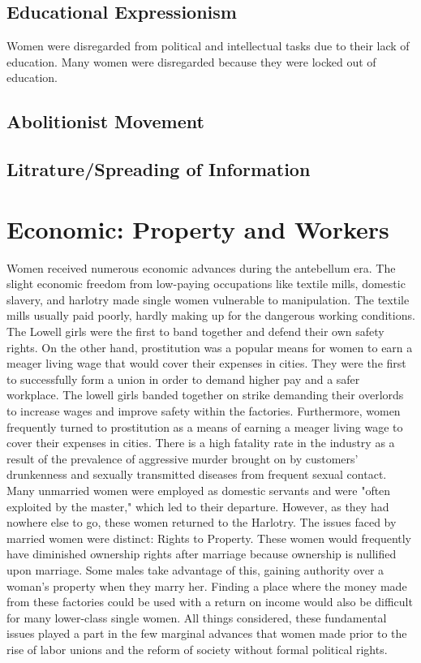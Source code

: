 \documentclass{article}
\begin{document}
\subsection{Educational Expressionism}
Women were disregarded from political and intellectual tasks due to their lack of education. Many women were disregarded because they were locked out of education.
\subsection{Abolitionist Movement}
\subsection{Litrature/Spreading of Information}
\section{Economic: Property and Workers}
Women received numerous economic advances during the antebellum era. The slight economic freedom from low-paying occupations like textile mills, domestic slavery, and harlotry made single women vulnerable to manipulation. The textile mills usually paid poorly, hardly making up for the dangerous working conditions. The Lowell girls were the first to band together and defend their own safety rights. On the other hand, prostitution was a popular means for women to earn a meager living wage that would cover their expenses in cities. They were the first to successfully form a union in order to demand higher pay and a safer workplace. The lowell girls banded together on strike demanding their overlords to increase wages and improve safety within the factories. Furthermore, women frequently turned to prostitution as a means of earning a meager living wage to cover their expenses in cities. There is a high fatality rate in the industry as a result of the prevalence of aggressive murder brought on by customers' drunkenness and sexually transmitted diseases from frequent sexual contact. Many unmarried women were employed as domestic servants and were "often exploited by the master,"\parencite{henretta} which led to their departure. However, as they had nowhere else to go, these women returned to the Harlotry. The issues faced by married women were distinct: Rights to Property. These women would frequently have diminished ownership rights after marriage because ownership is nullified upon marriage. Some males take advantage of this, gaining authority over a woman's property when they marry her. Finding a place where the money made from these factories could be used with a return on income would also be difficult for many lower-class single women. All things considered, these fundamental issues played a part in the few marginal advances that women made prior to the rise of labor unions and the reform of society without formal political rights.
\end{document}
